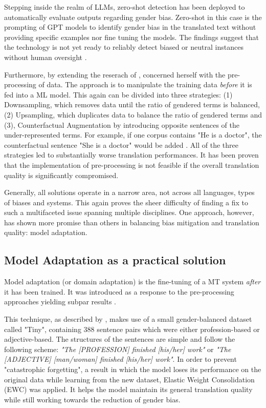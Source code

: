 Stepping inside the realm of LLMs, zero-shot detection has been deployed to automatically evaluate outputs regarding gender bias. Zero-shot in this case is the prompting of GPT models to identify gender bias in the translated text without providing specific examples nor fine tuning the models. The findings suggest that the technology is not yet ready to reliably detect biased or neutral instances without human oversight \citep{lardelliBuildingBridgesDataset2024}. 

Furthermore, by extending the reserach of \citet{tomalinPracticalEthicsBias2021}, \citet{ullmannGenderBiasMachine2022} concerned herself with the pre-processing of data. The approach is to manipulate the training data \textit{before} it is fed into a ML model. This again can be divided into three strategies: (1) Downsampling, which removes data until the ratio of gendered terms is balanced, (2) Upsampling, which duplicates data to balance the ratio of gendered terms and (3), Counterfactual Augmentation by introducing opposite sentences of the under-represented terms. For example, if one corpus contains "He is a doctor", the counterfactual sentence "She is a doctor" would be added \citep{ullmannGenderBiasMachine2022}. All of the three strategies led to substantially worse translation performances. It has been proven that the implementation of pre-processing is not feasible if the overall translation quality is significantly compromised.

Generally, all solutions operate in a narrow area, not across all languages, types of biases and systems. This again proves the sheer difficulty of finding a fix to such a multifaceted issue spanning multiple disciplines. One approach, however, has shown more promise than others in balancing bias mitigation and translation quality: model adaptation.

\subsection{Model Adaptation as a practical solution}
Model adaptation (or domain adaptation) is the fine-tuning of a MT system \textit{after} it has been trained. It was introduced as a response to the pre-processing approaches yielding subpar results \citep{tomalinPracticalEthicsBias2021}.

This technique, as described by \citet{tomalinPracticalEthicsBias2021}, makes use of a small gender-balanced dataset called "Tiny", containing 388 sentence pairs which were either profession-based or adjective-based. The structures of the sentences are simple and follow the following scheme: \textit{"The [PROFESSION] finished [his/her] work"} or \textit{"The [ADJECTIVE] [man/woman] finished [his/her] work"}. In order to prevent "catastrophic forgetting", a result in which the model loses its performance on the original data while learning from the new dataset, Elastic Weight Consolidation (EWC) was applied. It helps the model maintain its general translation quality while still working towards the reduction of gender bias.

